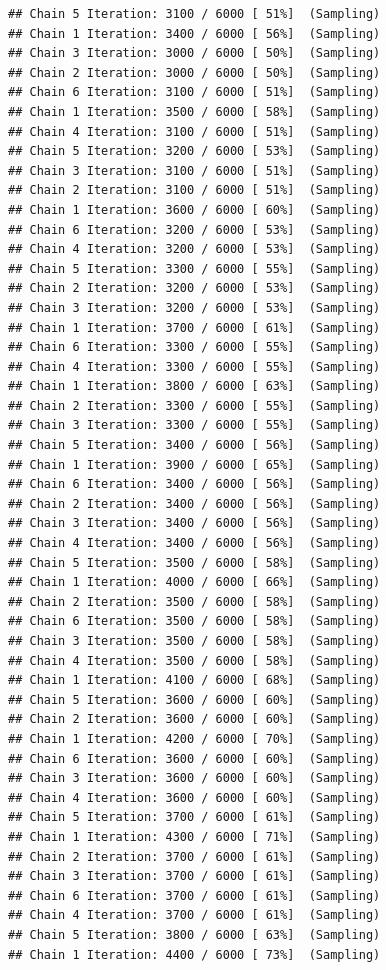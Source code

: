 \documentclass[
]{article}
\begin{document}
\begin{verbatim}
## Chain 5 Iteration: 3100 / 6000 [ 51%]  (Sampling) 
## Chain 1 Iteration: 3400 / 6000 [ 56%]  (Sampling) 
## Chain 3 Iteration: 3000 / 6000 [ 50%]  (Sampling) 
## Chain 2 Iteration: 3000 / 6000 [ 50%]  (Sampling) 
## Chain 6 Iteration: 3100 / 6000 [ 51%]  (Sampling) 
## Chain 1 Iteration: 3500 / 6000 [ 58%]  (Sampling) 
## Chain 4 Iteration: 3100 / 6000 [ 51%]  (Sampling) 
## Chain 5 Iteration: 3200 / 6000 [ 53%]  (Sampling) 
## Chain 3 Iteration: 3100 / 6000 [ 51%]  (Sampling) 
## Chain 2 Iteration: 3100 / 6000 [ 51%]  (Sampling) 
## Chain 1 Iteration: 3600 / 6000 [ 60%]  (Sampling) 
## Chain 6 Iteration: 3200 / 6000 [ 53%]  (Sampling) 
## Chain 4 Iteration: 3200 / 6000 [ 53%]  (Sampling) 
## Chain 5 Iteration: 3300 / 6000 [ 55%]  (Sampling) 
## Chain 2 Iteration: 3200 / 6000 [ 53%]  (Sampling) 
## Chain 3 Iteration: 3200 / 6000 [ 53%]  (Sampling) 
## Chain 1 Iteration: 3700 / 6000 [ 61%]  (Sampling) 
## Chain 6 Iteration: 3300 / 6000 [ 55%]  (Sampling) 
## Chain 4 Iteration: 3300 / 6000 [ 55%]  (Sampling) 
## Chain 1 Iteration: 3800 / 6000 [ 63%]  (Sampling) 
## Chain 2 Iteration: 3300 / 6000 [ 55%]  (Sampling) 
## Chain 3 Iteration: 3300 / 6000 [ 55%]  (Sampling) 
## Chain 5 Iteration: 3400 / 6000 [ 56%]  (Sampling) 
## Chain 1 Iteration: 3900 / 6000 [ 65%]  (Sampling) 
## Chain 6 Iteration: 3400 / 6000 [ 56%]  (Sampling) 
## Chain 2 Iteration: 3400 / 6000 [ 56%]  (Sampling) 
## Chain 3 Iteration: 3400 / 6000 [ 56%]  (Sampling) 
## Chain 4 Iteration: 3400 / 6000 [ 56%]  (Sampling) 
## Chain 5 Iteration: 3500 / 6000 [ 58%]  (Sampling) 
## Chain 1 Iteration: 4000 / 6000 [ 66%]  (Sampling) 
## Chain 2 Iteration: 3500 / 6000 [ 58%]  (Sampling) 
## Chain 6 Iteration: 3500 / 6000 [ 58%]  (Sampling) 
## Chain 3 Iteration: 3500 / 6000 [ 58%]  (Sampling) 
## Chain 4 Iteration: 3500 / 6000 [ 58%]  (Sampling) 
## Chain 1 Iteration: 4100 / 6000 [ 68%]  (Sampling) 
## Chain 5 Iteration: 3600 / 6000 [ 60%]  (Sampling) 
## Chain 2 Iteration: 3600 / 6000 [ 60%]  (Sampling) 
## Chain 1 Iteration: 4200 / 6000 [ 70%]  (Sampling) 
## Chain 6 Iteration: 3600 / 6000 [ 60%]  (Sampling) 
## Chain 3 Iteration: 3600 / 6000 [ 60%]  (Sampling) 
## Chain 4 Iteration: 3600 / 6000 [ 60%]  (Sampling) 
## Chain 5 Iteration: 3700 / 6000 [ 61%]  (Sampling) 
## Chain 1 Iteration: 4300 / 6000 [ 71%]  (Sampling) 
## Chain 2 Iteration: 3700 / 6000 [ 61%]  (Sampling) 
## Chain 3 Iteration: 3700 / 6000 [ 61%]  (Sampling) 
## Chain 6 Iteration: 3700 / 6000 [ 61%]  (Sampling) 
## Chain 4 Iteration: 3700 / 6000 [ 61%]  (Sampling) 
## Chain 5 Iteration: 3800 / 6000 [ 63%]  (Sampling) 
## Chain 1 Iteration: 4400 / 6000 [ 73%]  (Sampling) 

\end{verbatim}
\end{document}
